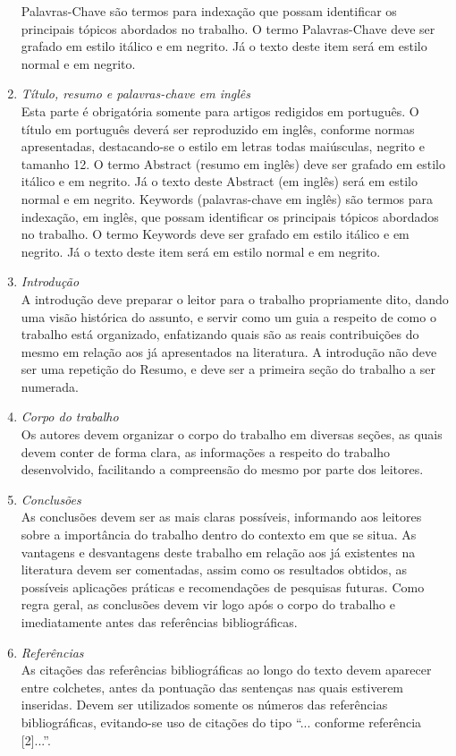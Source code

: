 \documentclass{ceel}
\begin{document}
\begin{multicols}{2}
\begin{enumerate}[1)]
Palavras-Chave são termos para indexação que possam identificar os principais tópicos abordados no trabalho. O termo Palavras-Chave deve ser grafado em estilo itálico e em negrito. Já o texto deste item será em estilo normal e em negrito.
\item \emph{Título, resumo e palavras-chave em inglês}\\
Esta parte é obrigatória somente para artigos redigidos em português. O título em português deverá ser reproduzido em inglês, conforme normas apresentadas, destacando-se o estilo em letras todas maiúsculas, negrito e tamanho 12. 
O termo Abstract (resumo em inglês) deve ser grafado em estilo itálico e em negrito. Já o texto deste Abstract (em inglês) será em estilo normal e em negrito. 
Keywords (palavras-chave em inglês) são termos para indexação, em inglês, que possam identificar os principais tópicos abordados no trabalho. O termo Keywords deve ser grafado em estilo itálico e em negrito. Já o texto deste item será em estilo normal e em negrito.
\item \emph{Introdução}\\
A introdução deve preparar o leitor para o trabalho propriamente dito, dando uma visão histórica do assunto, e servir como um guia a respeito de como o trabalho está organizado, enfatizando quais são as reais contribuições do mesmo em relação aos já apresentados na literatura. A introdução não deve ser uma repetição do Resumo, e deve ser a primeira seção do trabalho a ser numerada.
\item \emph{Corpo do trabalho}\\
Os autores devem organizar o corpo do trabalho em diversas seções, as quais devem conter de forma clara, as informações a respeito do trabalho desenvolvido, facilitando a compreensão do mesmo por parte dos leitores.
\item \emph{Conclusões}\\
As conclusões devem ser as mais claras possíveis, informando aos leitores sobre a importância do trabalho dentro do contexto em que se situa. As vantagens e desvantagens deste trabalho em relação aos já existentes na literatura devem ser comentadas, assim como os resultados obtidos, as possíveis aplicações práticas e recomendações de pesquisas futuras. Como regra geral, as conclusões devem vir logo após o corpo do trabalho e imediatamente antes das referências bibliográficas.
\item \emph{Referências}\\
As citações das referências bibliográficas ao longo do texto devem aparecer entre colchetes, antes da pontuação das sentenças nas quais estiverem inseridas. Devem ser utilizados somente os números das referências bibliográficas, evitando-se uso de citações do tipo “... conforme referência [2]...”.

\end{enumerate}
\end{multicols}
\end{document}
